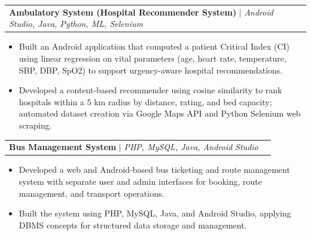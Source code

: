 \documentclass[letterpaper,10pt]{article}
\makeatletter
\newcommand{\resumeItem}[1]{
  \item\small{
    {#1 \vspace{-2pt}}
  }
}
\newcommand{\resumeProjectHeading}[2]{
    \item
    \begin{tabular*}{0.97\textwidth}{l@{\extracolsep{\fill}}r}
      \small#1 & #2 \\
    \end{tabular*}\vspace{-7pt}
}
\newcommand{\resumeItemListStart}{\begin{itemize}[noitemsep, topsep=0pt, parsep=0pt]}
\newcommand{\resumeItemListEnd}{\end{itemize}\vspace{-5pt}}
\makeatother
\begin{document}
  \resumeProjectHeading
    {\textbf{Ambulatory System (Hospital Recommender System)} $|$ \emph{Android Studio, Java, Python, ML, Selenium}}{}
    \resumeItemListStart
      \resumeItem{Built an Android application that computed a patient Critical Index (CI) using linear regression on vital parameters (age, heart rate, temperature, SBP, DBP, SpO2) to support urgency-aware hospital recommendations.}
      \resumeItem{Developed a content-based recommender using cosine similarity to rank hospitals within a 5 km radius by distance, rating, and bed capacity; automated dataset creation via Google Maps API and Python Selenium web scraping.}
    \resumeItemListEnd

  \resumeProjectHeading
    {\textbf{Bus Management System} $|$ \emph{PHP, MySQL, Java, Android Studio}}{}
    \resumeItemListStart
      \resumeItem{Developed a web and Android-based bus ticketing and route management system with separate user and admin interfaces for booking, route management, and transport operations.}
      \resumeItem{Built the system using PHP, MySQL, Java, and Android Studio, applying DBMS concepts for structured data storage and management.}
    \resumeItemListEnd



\end{document}
